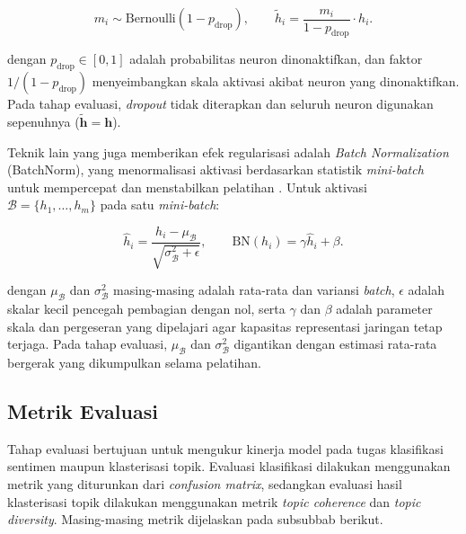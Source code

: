 \begin{equation}
    m_i \sim \text{Bernoulli}(1 - p_{\text{drop}}), \qquad
    \tilde{h}_i = \frac{m_i}{1 - p_{\text{drop}}} \cdot h_i.
    \label{eq:dropout}
\end{equation}

\noindent dengan $p_{\text{drop}} \in [0,1]$ adalah probabilitas neuron
dinonaktifkan, dan faktor $1/(1-p_{\text{drop}})$ menyeimbangkan skala
aktivasi akibat neuron yang dinonaktifkan. Pada tahap evaluasi,
\textit{dropout} tidak diterapkan dan seluruh neuron digunakan
sepenuhnya ($\tilde{\mathbf{h}} = \mathbf{h}$).

Teknik lain yang juga memberikan efek regularisasi adalah \textit{Batch
Normalization} (BatchNorm), yang menormalisasi aktivasi berdasarkan
statistik \textit{mini-batch} untuk mempercepat dan menstabilkan
pelatihan \parencite{ioffe2015batch}. Untuk aktivasi
$\mathcal{B} = \{h_1, \ldots, h_m\}$ pada satu \textit{mini-batch}:

\begin{equation}
    \hat{h}_i = \frac{h_i - \mu_{\mathcal{B}}}
    {\sqrt{\sigma_{\mathcal{B}}^2 + \epsilon}}, \qquad
    \text{BN}(h_i) = \gamma \hat{h}_i + \beta.
    \label{eq:batchnorm}
\end{equation}

\noindent dengan $\mu_{\mathcal{B}}$ dan $\sigma_{\mathcal{B}}^2$
masing-masing adalah rata-rata dan variansi \textit{batch}, $\epsilon$
adalah skalar kecil pencegah pembagian dengan nol, serta $\gamma$ dan
$\beta$ adalah parameter skala dan pergeseran yang dipelajari agar
kapasitas representasi jaringan tetap terjaga. Pada tahap evaluasi,
$\mu_{\mathcal{B}}$ dan $\sigma_{\mathcal{B}}^2$ digantikan dengan
estimasi rata-rata bergerak yang dikumpulkan selama pelatihan.

\subsection{Metrik Evaluasi}

Tahap evaluasi bertujuan untuk mengukur kinerja model pada tugas
klasifikasi sentimen maupun klasterisasi topik. Evaluasi klasifikasi
dilakukan menggunakan metrik yang diturunkan dari
\textit{confusion matrix}, sedangkan evaluasi hasil klasterisasi topik
dilakukan menggunakan metrik \textit{topic coherence} dan
\textit{topic diversity}. Masing-masing metrik dijelaskan pada
subsubbab berikut.

